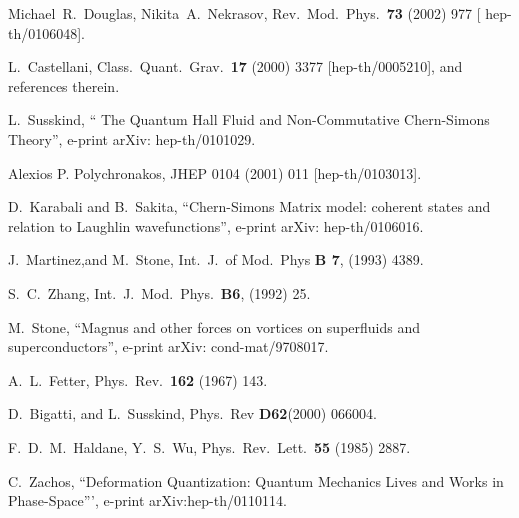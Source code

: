 \documentclass[a4paper,12pt]{article} \tolerance=200
\begin{document}
\begin{thebibliography}{99}
 Michael~R.~Douglas, Nikita~A.~Nekrasov,
  Rev.~Mod.~Phys.~{\bf 73} (2002) 977 [ hep-th/0106048].
  
 L.~Castellani, Class.~Quant.~Grav.~{\bf 17}
  (2000) 3377 [hep-th/0005210], and references therein.
  
L.~Susskind, `` The Quantum Hall Fluid and
  Non-Commutative Chern-Simons Theory'', e-print arXiv:
  hep-th/0101029.
  
 Alexios P. Polychronakos, JHEP 0104 (2001) 011
  [hep-th/0103013].
  
D.~Karabali and B.~Sakita, ``Chern-Simons Matrix model:
  coherent states and relation to Laughlin wavefunctions'', e-print
  arXiv: hep-th/0106016.
  
J.~Martinez,and M.~Stone, Int.~J.~of Mod.~Phys {\bf B
    7}, (1993) 4389.
  
 S.~C.~Zhang, Int.~J.~Mod.~Phys.~{\bf B6}, (1992) 25.
  
 M.~Stone, ``Magnus and other forces on vortices on
  superfluids and superconductors'', e-print arXiv: cond-mat/9708017.
  
 A.~L.~Fetter, Phys.~Rev.~{\bf 162} (1967) 143.
 
 D.~Bigatti, and L.~Susskind, Phys.~Rev {\bf D62}(2000)
  066004.
  
F.~D.~M.~Haldane, Y.~S.~Wu, Phys.~Rev.~Lett.~{\bf 55}
  (1985) 2887.
  
C.~Zachos, ``Deformation Quantization: Quantum
  Mechanics Lives and Works in Phase-Space''', e-print
  arXiv:hep-th/0110114.
\end{thebibliography}
\end{document}
